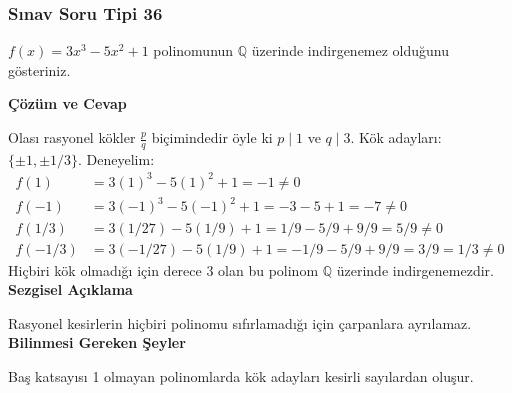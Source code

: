 \documentclass[11pt, a4paper]{article}
\newenvironment{cozum}{
    \vspace{0.5cm}
    \noindent\textcolor{green!60!black}{\faCheckCircle\enspace \textbf{\Large Çözüm ve Cevap}}\par\vspace{0.2cm}
}{}
\newenvironment{sezgisel}{
    \vspace{0.5cm}
    \noindent\textcolor{orange!80!black}{\faLightbulb\enspace \textbf{\Large Sezgisel Açıklama}}\par\vspace{0.2cm}
    \itshape
}{}
\newenvironment{bilgi}{
    \vspace{0.5cm}
    \noindent\textcolor{red!70!black}{\faExclamationTriangle\enspace \textbf{\Large Bilinmesi Gereken Şeyler}}\par\vspace{0.2cm}
}{}
\begin{document}
\newpage
\subsubsection{Sınav Soru Tipi 36}
\begin{sinavbox}
$f(x) = 3x^3-5x^2+1$ polinomunun $\mathbb{Q}$ üzerinde indirgenemez olduğunu gösteriniz.
\end{sinavbox}
\begin{cozum}
Olası rasyonel kökler $\frac{p}{q}$ biçimindedir öyle ki $p \mid 1$ ve $q \mid 3$.
Kök adayları: $\{\pm 1, \pm 1/3\}$.
Deneyelim:
\begin{align*}
f(1) &= 3(1)^3 - 5(1)^2 + 1 = -1 \neq 0 \\
f(-1) &= 3(-1)^3 - 5(-1)^2 + 1 = -3 - 5 + 1 = -7 \neq 0 \\
f(1/3) &= 3(1/27) - 5(1/9) + 1 = 1/9 - 5/9 + 9/9 = 5/9 \neq 0 \\
f(-1/3) &= 3(-1/27) - 5(1/9) + 1 = -1/9 - 5/9 + 9/9 = 3/9 = 1/3 \neq 0
\end{align*}
Hiçbiri kök olmadığı için derece 3 olan bu polinom $\mathbb{Q}$ üzerinde indirgenemezdir.
\end{cozum}
\begin{sezgisel}
Rasyonel kesirlerin hiçbiri polinomu sıfırlamadığı için çarpanlara ayrılamaz.
\end{sezgisel}
\begin{bilgi}
Baş katsayısı 1 olmayan polinomlarda kök adayları kesirli sayılardan oluşur.
\end{bilgi}

\newpage
\end{document}
